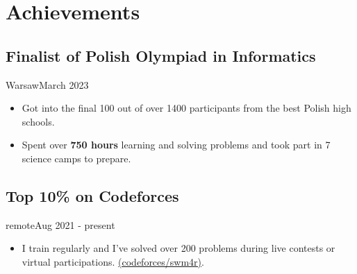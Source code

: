 \section{Achievements}
\subsection{Finalist of Polish Olympiad in Informatics}{Warsaw}{March 2023}
\begin{itemize}
    \item Got into the final 100 out of over 1400 participants from the best Polish high schools.
    \item Spent over \textbf{750 hours} learning and solving problems and took part in 7 science camps to prepare.
\end{itemize}

\subsection{Top 10\% on Codeforces}{remote}{Aug 2021 - present}
\begin{itemize}
    \item I train regularly and I've solved over 200 problems during live contests or virtual participations. \href{https://codeforces.com/profile/swm4r}{(codeforces/swm4r)}.
\end{itemize}

\vspace{1em}